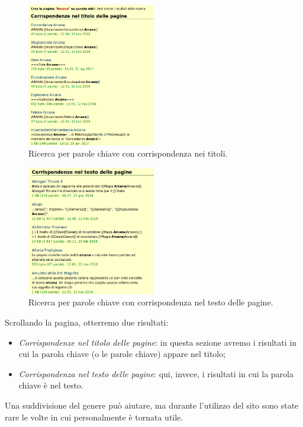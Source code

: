 \begin{figure}[hbt]
    \centering
    \includegraphics[width=0.5\textwidth]{img/ricerca4.png} 
    \caption{Ricerca per parole chiave con corrispondenza nei titoli.}
\end{figure}

\begin{figure}[!hbt]
    \centering
    \includegraphics[width=0.5\textwidth]{img/ricerca5.png} 
    \caption{Ricerca per parole chiave con corrispondenza nel testo delle pagine.}
\end{figure} 

Scrollando la pagina, otterremo due risultati:
\begin{itemize}
    \item \emph{Corrispondenze nel titolo delle pagine}: in questa sezione avremo i risultati in cui la parola chiave (o le parole chiave)
    appare nel titolo;
    \item \emph{Corrispondenza nel testo delle pagine}: qui, invece, i risultati in cui la parola chiave è nel testo.
\end{itemize}

Una suddivisione del genere può aiutare, ma durante l'utilizzo del sito sono state rare le volte in cui personalmente 
è tornata utile.

